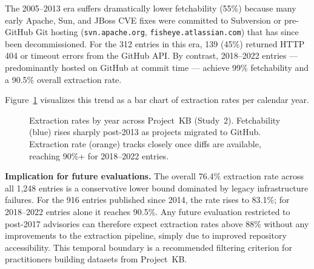 \documentclass[sigconf,nonacm]{acmart}
\begin{document}
The 2005--2013 era suffers dramatically lower fetchability (55\%) because
many early Apache, Sun, and JBoss CVE fixes were committed to Subversion
or pre-GitHub Git hosting (\texttt{svn.apache.org},
\texttt{fisheye.atlassian.com}) that has since been decommissioned.
For the 312 entries in this era, 139 (45\%) returned HTTP 404 or
timeout errors from the GitHub API.
By contrast, 2018--2022 entries --- predominantly hosted on GitHub at
commit time --- achieve 99\% fetchability and a 90.5\% overall extraction
rate.

Figure~\ref{fig:temporal} visualizes this trend as a bar chart of
extraction rates per calendar year.

\begin{figure}[t]
\centering
{}
\caption{Extraction rates by year across Project~KB (Study~2). Fetchability
(blue) rises sharply post-2013 as projects migrated to GitHub. Extraction
rate (orange) tracks closely once diffs are available, reaching 90\%+ for
2018--2022 entries.}
\label{fig:temporal}
\end{figure}

\textbf{Implication for future evaluations.}
The overall 76.4\% extraction rate across all 1{,}248 entries is a
conservative lower bound dominated by legacy infrastructure failures.
For the 916 entries published since 2014, the rate rises to 83.1\%;
for 2018--2022 entries alone it reaches 90.5\%.
Any future evaluation restricted to post-2017 advisories can therefore
expect extraction rates above 88\% without any improvements to the
extraction pipeline, simply due to improved repository accessibility.
This temporal boundary is a recommended filtering criterion for
practitioners building datasets from Project~KB.
\end{document}
